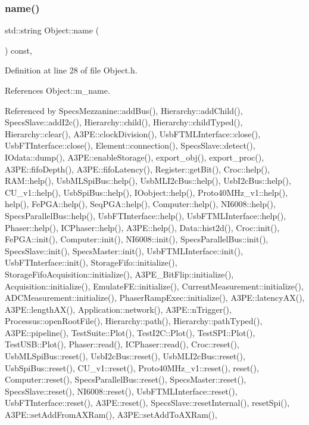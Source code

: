 \subsubsection{\texorpdfstring{name()}{name()}}
{\footnotesize\ttfamily std\+::string Object\+::name (\begin{DoxyParamCaption}{ }\end{DoxyParamCaption}) const\hspace{0.3cm}{\ttfamily [inline]}, {\ttfamily [inherited]}}



Definition at line 28 of file Object.\+h.



References Object\+::m\+\_\+name.



Referenced by Specs\+Mezzanine\+::add\+Bus(), Hierarchy\+::add\+Child(), Specs\+Slave\+::add\+I2c(), Hierarchy\+::child(), Hierarchy\+::child\+Typed(), Hierarchy\+::clear(), A3\+P\+E\+::clock\+Division(), Usb\+F\+T\+M\+L\+Interface\+::close(), Usb\+F\+T\+Interface\+::close(), Element\+::connection(), Specs\+Slave\+::detect(), I\+Odata\+::dump(), A3\+P\+E\+::enable\+Storage(), export\+\_\+obj(), export\+\_\+proc(), A3\+P\+E\+::fifo\+Depth(), A3\+P\+E\+::fifo\+Latency(), Register\+::get\+Bit(), Croc\+::help(), R\+A\+M\+::help(), Usb\+M\+L\+Spi\+Bus\+::help(), Usb\+M\+L\+I2c\+Bus\+::help(), Usb\+I2c\+Bus\+::help(), C\+U\+\_\+v1\+::help(), Usb\+Spi\+Bus\+::help(), I\+Oobject\+::help(), Proto40\+M\+Hz\+\_\+v1\+::help(), help(), Fe\+P\+G\+A\+::help(), Seq\+P\+G\+A\+::help(), Computer\+::help(), N\+I6008\+::help(), Specs\+Parallel\+Bus\+::help(), Usb\+F\+T\+Interface\+::help(), Usb\+F\+T\+M\+L\+Interface\+::help(), Phaser\+::help(), I\+C\+Phaser\+::help(), A3\+P\+E\+::help(), Data\+::hist2d(), Croc\+::init(), Fe\+P\+G\+A\+::init(), Computer\+::init(), N\+I6008\+::init(), Specs\+Parallel\+Bus\+::init(), Specs\+Slave\+::init(), Specs\+Master\+::init(), Usb\+F\+T\+M\+L\+Interface\+::init(), Usb\+F\+T\+Interface\+::init(), Storage\+Fifo\+::initialize(), Storage\+Fifo\+Acquisition\+::initialize(), A3\+P\+E\+\_\+\+Bit\+Flip\+::initialize(), Acquisition\+::initialize(), Emulate\+F\+E\+::initialize(), Current\+Measurement\+::initialize(), A\+D\+C\+Measurement\+::initialize(), Phaser\+Ramp\+Exec\+::initialize(), A3\+P\+E\+::latency\+A\+X(), A3\+P\+E\+::length\+A\+X(), Application\+::network(), A3\+P\+E\+::n\+Trigger(), Processus\+::open\+Root\+File(), Hierarchy\+::path(), Hierarchy\+::path\+Typed(), A3\+P\+E\+::pipeline(), Test\+Suite\+::\+Plot(), Test\+I2\+C\+::\+Plot(), Test\+S\+P\+I\+::\+Plot(), Test\+U\+S\+B\+::\+Plot(), Phaser\+::read(), I\+C\+Phaser\+::read(), Croc\+::reset(), Usb\+M\+L\+Spi\+Bus\+::reset(), Usb\+I2c\+Bus\+::reset(), Usb\+M\+L\+I2c\+Bus\+::reset(), Usb\+Spi\+Bus\+::reset(), C\+U\+\_\+v1\+::reset(), Proto40\+M\+Hz\+\_\+v1\+::reset(), reset(), Computer\+::reset(), Specs\+Parallel\+Bus\+::reset(), Specs\+Master\+::reset(), Specs\+Slave\+::reset(), N\+I6008\+::reset(), Usb\+F\+T\+M\+L\+Interface\+::reset(), Usb\+F\+T\+Interface\+::reset(), A3\+P\+E\+::reset(), Specs\+Slave\+::reset\+Internal(), reset\+Spi(), A3\+P\+E\+::set\+Add\+From\+A\+X\+Ram(), A3\+P\+E\+::set\+Add\+To\+A\+X\+Ram(), 